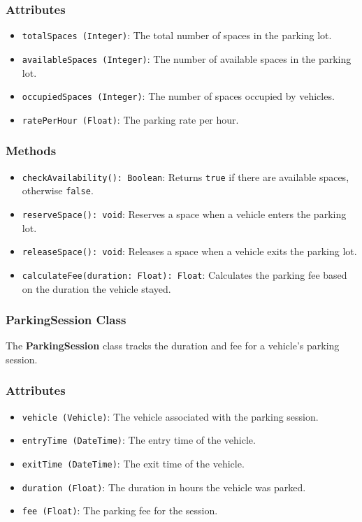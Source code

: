 \subsubsection*{Attributes}
\begin{itemize}
    \item \texttt{totalSpaces (Integer)}: The total number of spaces in the parking lot.
    \item \texttt{availableSpaces (Integer)}: The number of available spaces in the parking lot.
    \item \texttt{occupiedSpaces (Integer)}: The number of spaces occupied by vehicles.
    \item \texttt{ratePerHour (Float)}: The parking rate per hour.
\end{itemize}

\subsubsection*{Methods}
\begin{itemize}
    \item \texttt{checkAvailability(): Boolean}: Returns \texttt{true} if there are available spaces, otherwise \texttt{false}.
    \item \texttt{reserveSpace(): void}: Reserves a space when a vehicle enters the parking lot.
    \item \texttt{releaseSpace(): void}: Releases a space when a vehicle exits the parking lot.
    \item \texttt{calculateFee(duration: Float): Float}: Calculates the parking fee based on the duration the vehicle stayed.
\end{itemize}

\subsubsection{ParkingSession Class}
The \textbf{ParkingSession} class tracks the duration and fee for a vehicle's parking session.

\subsubsection*{Attributes}
\begin{itemize}
    \item \texttt{vehicle (Vehicle)}: The vehicle associated with the parking session.
    \item \texttt{entryTime (DateTime)}: The entry time of the vehicle.
    \item \texttt{exitTime (DateTime)}: The exit time of the vehicle.
    \item \texttt{duration (Float)}: The duration in hours the vehicle was parked.
    \item \texttt{fee (Float)}: The parking fee for the session.
\end{itemize}

